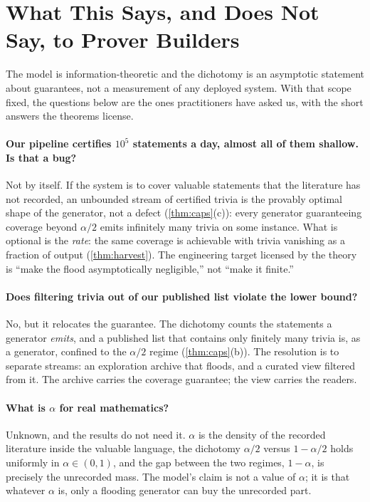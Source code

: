 \documentclass[11pt]{article}
\numberwithin{equation}{section}
\theoremstyle{plain}
\theoremstyle{definition}
\theoremstyle{remark}
\begin{document}
\section{What This Says, and Does Not Say, to Prover Builders}
\label{app:faq}

The model is information-theoretic and the dichotomy is an asymptotic statement about
guarantees, not a measurement of any deployed system. With that scope fixed, the questions
below are the ones practitioners have asked us, with the short answers the theorems
license.

\paragraph{Our pipeline certifies $10^5$ statements a day, almost all of them shallow. Is
that a bug?}
Not by itself. If the system is to cover valuable statements that the literature has not
recorded, an unbounded stream of certified trivia is the provably optimal shape of the
generator, not a defect (\cref{thm:caps}(c)): every generator guaranteeing coverage beyond
$\alpha/2$ emits infinitely many trivia on some instance. What is optional is the
\emph{rate}: the same coverage is achievable with trivia vanishing as a fraction of output
(\cref{thm:harvest}). The engineering target licensed by the theory is ``make the flood
asymptotically negligible,'' not ``make it finite.''

\paragraph{Does filtering trivia out of our published list violate the lower bound?}
No, but it relocates the guarantee. The dichotomy counts the statements a generator
\emph{emits}, and a published list that contains only finitely many trivia is, as a
generator, confined to the $\alpha/2$ regime (\cref{thm:caps}(b)). The resolution is to
separate streams: an exploration archive that floods, and a curated view filtered from it.
The archive carries the coverage guarantee; the view carries the readers.

\paragraph{What is $\alpha$ for real mathematics?}
Unknown, and the results do not need it. $\alpha$ is the density of the recorded literature
inside the valuable language, the dichotomy $\alpha/2$ versus $1 - \alpha/2$ holds
uniformly in $\alpha \in (0,1)$, and the gap between the two regimes, $1 - \alpha$, is
precisely the unrecorded mass. The model's claim is not a value of $\alpha$; it is that
whatever $\alpha$ is, only a flooding generator can buy the unrecorded part.
\end{document}
